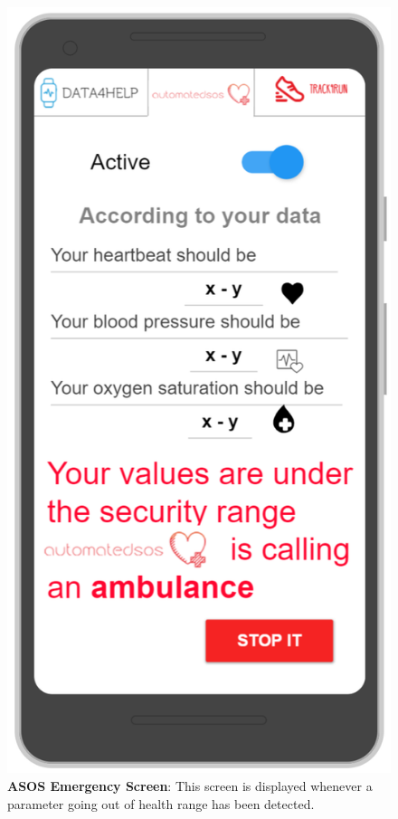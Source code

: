 \begin{figure}[H]
\centering
\includegraphics[scale = 0.5]{Mocks/Mobile_ASOS_Emergency.PNG}
\caption{\textbf{ASOS Emergency Screen}: This screen is displayed whenever a parameter going out of health range has been detected.}
\end{figure}

